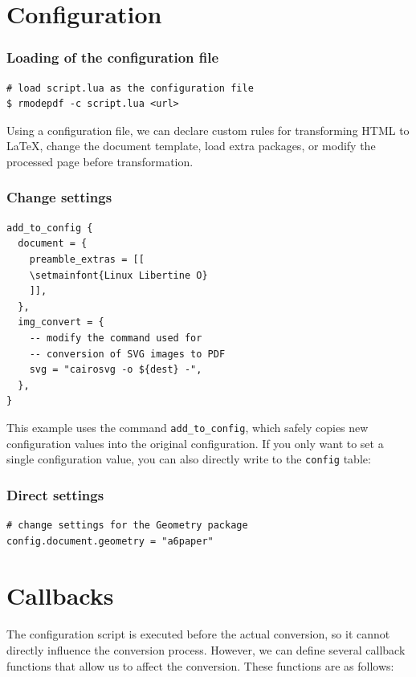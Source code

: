 \section{Configuration}

\begin{frame}[fragile]
  \frametitle{Loading of the configuration file}

\begin{verbatim}
# load script.lua as the configuration file
$ rmodepdf -c script.lua <url>
\end{verbatim}
\end{frame}

Using a configuration file, we can declare custom rules for transforming HTML
to \LaTeX, change the document template, load extra packages, or modify the
processed page before transformation.


\begin{frame}[fragile]
  \frametitle{Change settings}
\begin{verbatim}
add_to_config {
  document = {
    preamble_extras = [[
    \setmainfont{Linux Libertine O}
    ]],
  },
  img_convert = {
    -- modify the command used for 
    -- conversion of SVG images to PDF
    svg = "cairosvg -o ${dest} -",
  },
}
\end{verbatim}


\end{frame}

This example uses the command \texttt{add\_to\_config}, which safely copies new
configuration values into the original configuration. If you only want to set a
single configuration value, you can also directly write to the \texttt{config}
table:

\begin{frame}[fragile]
  \frametitle{Direct settings}
\begin{verbatim}
# change settings for the Geometry package
config.document.geometry = "a6paper"
\end{verbatim}
\end{frame}

\section{Callbacks}

The configuration script is executed before the actual conversion, so it cannot
directly influence the conversion process. However, we can define several
callback functions that allow us to affect the conversion. These functions are
as follows:

